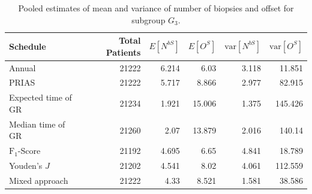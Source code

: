 \begin{table}[!htb]
\centering
\captionsetup{justification=centering}
\caption{Pooled estimates of mean and variance of number of biopsies and offset for subgroup $G_3$.}
\label{table : sim_study_pooled_estimates_G3}
\begin{tabular}{@{}lrrrrr@{}}
\toprule
Schedule           & Total Patients & $E[N^{bS}]$ & $E[O^{S}]$ & $\mbox{var}[N^{bS}]$ & $\mbox{var}[O^S]$ \\ \midrule
Annual              & 21222                  & 6.214           & 6.03                & 3.118          & 11.851             \\
PRIAS              & 21222                  & 5.717           & 8.866               & 2.977          & 82.915             \\
Expected time of GR  & 21234                  & 1.921           & 15.006              & 1.375          & 145.426            \\
Median time of GR   & 21260                  & 2.07            & 13.879              & 2.016          & 140.14             \\
$\text{F}_1$-Score           & 21192                  & 4.695           & 6.65                & 4.841          & 18.789             \\
Youden's $J$              & 21202                  & 4.541           & 8.02                & 4.061          & 112.559             \\
Mixed approach     & 21222                  & 4.33            & 8.521               & 1.581          & 38.586             \\ \bottomrule
\end{tabular}
\end{table}

